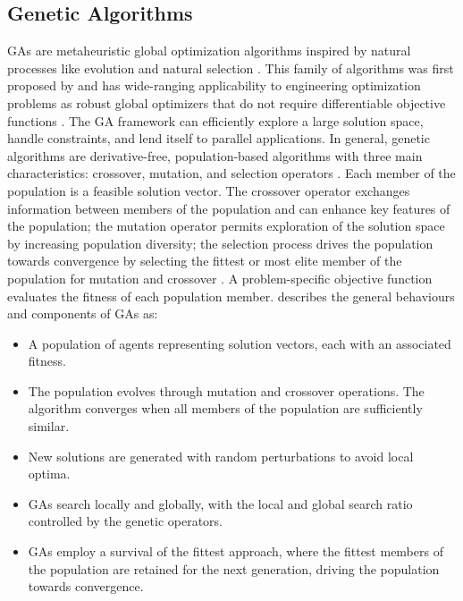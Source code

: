 \subsection{Genetic Algorithms}
\label{subsec:01genetic}

\Glspl{GA} are metaheuristic global optimization algorithms inspired by natural processes like evolution and natural selection \citep{cui2024applications}. This family of algorithms was first proposed by \cite{holland1992genetic} and has wide-ranging applicability to engineering optimization problems as robust global optimizers that do not require differentiable objective functions \citep{carbas2021nature}. The \gls{GA} framework can efficiently explore a large solution space, handle constraints, and lend itself to parallel applications. In general, genetic algorithms are derivative-free, population-based algorithms with three main characteristics: crossover, mutation, and selection operators \citep{yang2018nature}. Each member of the population is a feasible solution vector. The crossover operator exchanges information between members of the population and can enhance key features of the population; the mutation operator permits exploration of the solution space by increasing population diversity; the selection process drives the population towards convergence by selecting the fittest or most elite member of the population for mutation and crossover \citep{yang2018nature}. A problem-specific objective function evaluates the fitness of each population member. \cite{yang2018nature} describes the general behaviours and components of \glspl{GA} as:
\begin{itemize}[noitemsep]
    \item A population of agents representing solution vectors, each with an associated fitness.
    \item The population evolves through mutation and crossover operations. The algorithm converges when all members of the population are sufficiently similar.
    \item New solutions are generated with random perturbations to avoid local optima.
    \item \Glspl{GA} search locally and globally, with the local and global search ratio controlled by the genetic operators.
    \item \Glspl{GA} employ a survival of the fittest approach, where the fittest members of the population are retained for the next generation, driving the population towards convergence.
\end{itemize}

